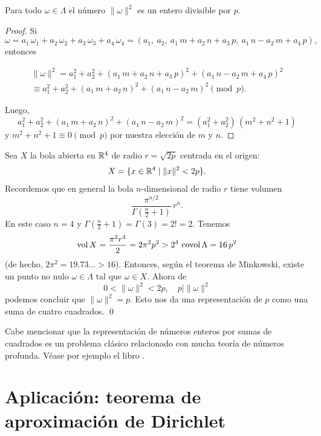\begin{lema}
  Para todo $\omega\in \Lambda$ el número $\|\omega\|^2$ es un entero
  divisible por $p$.

  \begin{proof}
    Si
    $$\omega = a_1\,\omega_1 + a_2\,\omega_2 + a_3\,\omega_3 + a_4\,\omega_4 = (a_1, ~ a_2, ~ a_1\,m+a_2\,n + a_3\,p, ~ a_1\,n-a_2\,m + a_4\,p),$$
    entonces

    \begin{multline*}
      \|\omega\|^2 = a_1^2 + a_2^2 + (a_1\,m+a_2\,n + a_3\,p)^2 + (a_1\,n-a_2\,m + a_4\,p)^2 \\
      \equiv a_1^2 + a_2^2 + (a_1\,m+a_2\,n)^2 + (a_1\,n-a_2\,m)^2 \pmod{p}.
    \end{multline*}

    Luego,
    $$a_1^2 + a_2^2 + (a_1\,m+a_2\,n)^2 + (a_1\,n-a_2\,m)^2 = (a_1^2 + a_2^2)\,(m^2 + n^2 + 1)$$
    y $m^2 + n^2 + 1 \equiv 0 \pmod{p}$ por nuestra elección de $m$ y $n$.
  \end{proof}
\end{lema}

Sea $X$ la bola abierta en $\mathbb{R}^4$ de radio $r = \sqrt{2p}$ centrada en el
origen:
$$X = \{ x \in \mathbb{R}^4 \mid \|x\|^2 < 2p \}.$$
Recordemos que en general la bola $n$-dimensional de radio $r$ tiene volumen
$$\frac{\pi^{n/2}}{\Gamma \left(\frac{n}{2}+1\right)}\,r^n.$$
En este caso $n = 4$ y
$\Gamma \left(\frac{n}{2}+1\right) = \Gamma (3) = 2! = 2$. Tenemos
$$\operatorname{vol} X = \frac{\pi^2 r^4}{2} = 2 \pi^2 p^2 > 2^4\,\operatorname{covol} \Lambda = 16\,p^2$$
(de hecho, $2 \pi^2 = 19.73\ldots > 16$). Entonces, según el teorema de
Minkowski, existe un punto no nulo $\omega\in \Lambda$ tal que
$\omega \in X$. Ahora de
$$0 < \|\omega\|^2 < 2p, \quad p \mid \|\omega\|^2$$
podemos concluir que $\|\omega\|^2 = p$. Esto nos da una representación de $p$
como una suma de cuatro cuadrados. \qed

\vspace{1em}

Cabe mencionar que la representación de números enteros por sumas de cuadrados
es un problema clásico relacionado con mucha teoría de números profunda. Véase
por ejemplo el libro \cite{Grosswald-1985}.


\section{Aplicación: teorema de aproximación de Dirichlet}

